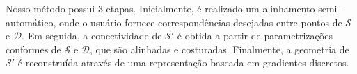 Nosso método possui 3 etapas. Inicialmente, é realizado um alinhamento semi-automático, onde o usuário fornece correspondências desejadas entre pontos de $\mathcal{S}$ e $\mathcal{D}$. Em seguida, a conectividade de $\mathcal{S}'$ é obtida a partir de parametrizações conformes de $\mathcal{S}$ e $\mathcal{D}$, que são alinhadas e costuradas. Finalmente, a geometria de $\mathcal{S}'$ é reconstruída através de uma representação baseada em gradientes discretos.













%



%


%


%
